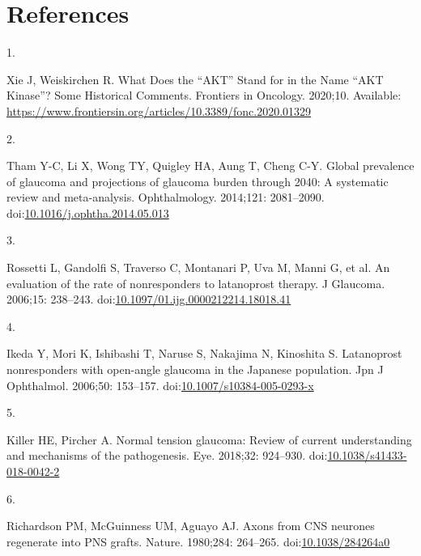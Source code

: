 \documentclass[
  12pt,
  a4paper,
]{book}
\newlength{\cslhangindent}
\newlength{\csllabelwidth}
\newenvironment{CSLReferences}[2] %
 {\begin{list}{}{%
  \setlength{\itemindent}{0pt}
  \setlength{\leftmargin}{0pt}
  \setlength{\parsep}{0pt}
  \ifodd #1
   \setlength{\leftmargin}{\cslhangindent}
   \setlength{\itemindent}{-1\cslhangindent}
  \fi
  \setlength{\itemsep}{#2\baselineskip}}}
 {\end{list}}
\newcommand{\CSLLeftMargin}[1]{\parbox[t]{\csllabelwidth}{\strut#1\strut}}
\newcommand{\CSLRightInline}[1]{\parbox[t]{\linewidth - \csllabelwidth}{\strut#1\strut}}
\begin{document}
\chapter*{References}\label{BIB}


\label{refs}
\begin{CSLReferences}{0}{1}
\CSLLeftMargin{1. }%
\CSLRightInline{Xie J, Weiskirchen R. What {Does} the {``{AKT}''} {Stand} for in the {Name} {``{AKT Kinase}''}? {Some Historical Comments}. Frontiers in Oncology. 2020;10. Available: \url{https://www.frontiersin.org/articles/10.3389/fonc.2020.01329}}

\CSLLeftMargin{2. }%
\CSLRightInline{Tham Y-C, Li X, Wong TY, Quigley HA, Aung T, Cheng C-Y. Global prevalence of glaucoma and projections of glaucoma burden through 2040: A systematic review and meta-analysis. Ophthalmology. 2014;121: 2081--2090. doi:\href{https://doi.org/10.1016/j.ophtha.2014.05.013}{10.1016/j.ophtha.2014.05.013}}

\CSLLeftMargin{3. }%
\CSLRightInline{Rossetti L, Gandolfi S, Traverso C, Montanari P, Uva M, Manni G, et al. An evaluation of the rate of nonresponders to latanoprost therapy. J Glaucoma. 2006;15: 238--243. doi:\href{https://doi.org/10.1097/01.ijg.0000212214.18018.41}{10.1097/01.ijg.0000212214.18018.41}}

\CSLLeftMargin{4. }%
\CSLRightInline{Ikeda Y, Mori K, Ishibashi T, Naruse S, Nakajima N, Kinoshita S. Latanoprost nonresponders with open-angle glaucoma in the {Japanese} population. Jpn J Ophthalmol. 2006;50: 153--157. doi:\href{https://doi.org/10.1007/s10384-005-0293-x}{10.1007/s10384-005-0293-x}}

\CSLLeftMargin{5. }%
\CSLRightInline{Killer HE, Pircher A. Normal tension glaucoma: Review of current understanding and mechanisms of the pathogenesis. Eye. 2018;32: 924--930. doi:\href{https://doi.org/10.1038/s41433-018-0042-2}{10.1038/s41433-018-0042-2}}

\CSLLeftMargin{6. }%
\CSLRightInline{Richardson PM, McGuinness UM, Aguayo AJ. Axons from {CNS} neurones regenerate into {PNS} grafts. Nature. 1980;284: 264--265. doi:\href{https://doi.org/10.1038/284264a0}{10.1038/284264a0}}


\end{CSLReferences}
\end{document}

